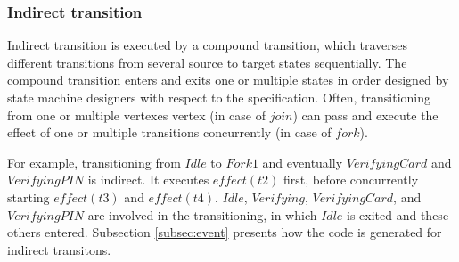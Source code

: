 \subsubsection{Indirect transition}
Indirect transition is executed by a compound transition, which traverses different transitions from several source to target states sequentially. The compound transition enters and exits one or multiple states in order designed by state machine designers with respect to the specification. Often, transitioning from one or multiple vertexes vertex (in case of $join$) can pass and execute the effect of one or multiple transitions concurrently (in case of $fork$). 

For example, transitioning from $Idle$ to $Fork1$ and eventually $VerifyingCard$ and $VerifyingPIN$ is indirect. It executes $effect(t2)$ first, before concurrently starting $effect(t3)$ and $effect(t4)$. $Idle$, $Verifying$, $VerifyingCard$, and $VerifyingPIN$ are involved in the transitioning, in which $Idle$ is exited and these others entered. Subsection \ref{subsec:event} presents how the code is generated for indirect transitons.